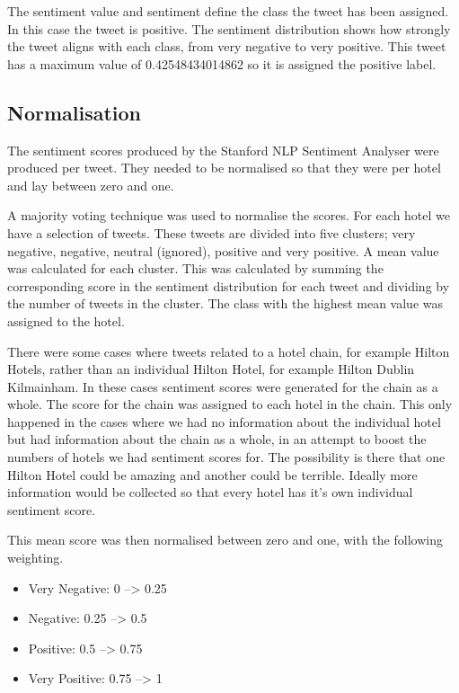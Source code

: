 The sentiment value and sentiment define the class the tweet has been assigned. In this case the tweet is positive. The sentiment distribution shows how strongly the tweet aligns with each class, from very negative to very positive. This tweet has a maximum value of 0.42548434014862 so it is assigned the positive label.

\subsection{Normalisation}

The sentiment scores produced by the Stanford NLP Sentiment Analyser were produced per tweet. They needed to be normalised so that they were per hotel and lay between zero and one.

A majority voting technique was used to normalise the scores. For each hotel we have a selection of tweets. These tweets are divided into five clusters; very negative, negative, neutral (ignored), positive and very positive. A mean value was calculated for each cluster. This was calculated by summing the corresponding score in the sentiment distribution for each tweet and dividing by the number of tweets in the cluster. The class with the highest mean value was assigned to the hotel.

There were some cases where tweets related to a hotel chain, for example Hilton Hotels, rather than an individual Hilton Hotel, for example Hilton Dublin Kilmainham. In these cases sentiment scores were generated for the chain as a whole. The score for the chain was assigned to each hotel in the chain. This only happened in the cases where we had no information about the individual hotel but had information about the chain as a whole, in an attempt to boost the numbers of hotels we had sentiment scores for. The possibility is there that one Hilton Hotel could be amazing and another could be terrible. Ideally more information would be collected so that every hotel has it's own individual sentiment score.

This mean score was then normalised between zero and one, with the following weighting.
\begin{itemize}
    \item Very Negative: 0 --> 0.25
    \item Negative: 0.25 --> 0.5
    \item Positive: 0.5 --> 0.75
    \item Very Positive: 0.75 --> 1
\end{itemize}

